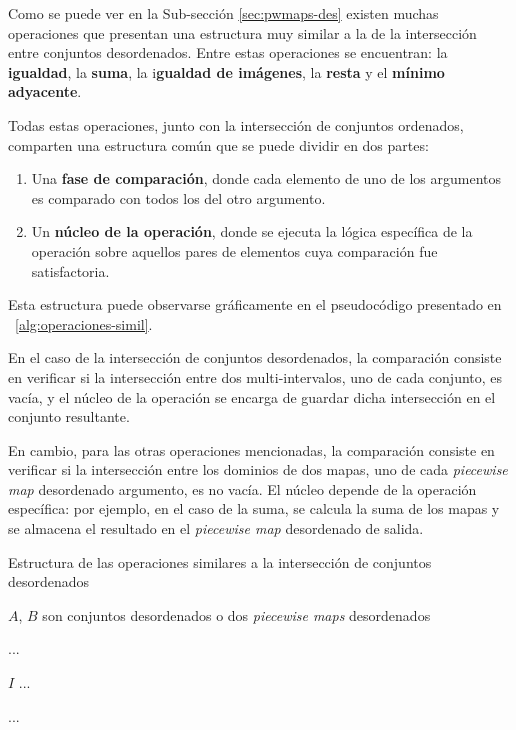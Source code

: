 Como se puede ver en la Sub-sección \ref{sec:pwmaps-des} existen muchas operaciones que presentan una estructura muy similar a la de la intersección entre conjuntos desordenados. Entre estas operaciones se encuentran: la \textbf{igualdad}, la \textbf{suma}, la i\textbf{gualdad de imágenes}, la \textbf{resta} y el \textbf{mínimo adyacente}.

Todas estas operaciones, junto con la intersección de conjuntos ordenados, comparten una estructura común que se puede dividir en dos partes: 
\begin{enumerate}
    \item Una\textbf{ fase de comparación}, donde cada elemento de uno de los argumentos es comparado con todos los del otro argumento.
    \item Un \textbf{núcleo de la operación}, donde se ejecuta la lógica específica de la operación sobre aquellos pares de elementos cuya comparación fue satisfactoria.
\end{enumerate}

Esta estructura puede observarse gráficamente en el pseudocódigo presentado en ~\ref{alg:operaciones-simil}.

En el caso de la intersección de conjuntos desordenados, la comparación consiste en verificar si la intersección entre dos multi-intervalos, uno de cada conjunto, es vacía, y el núcleo de la operación se encarga de guardar dicha intersección en el conjunto resultante.

En cambio, para las otras operaciones mencionadas, la comparación consiste en verificar si la intersección entre los dominios de dos mapas, uno de cada \textit{piecewise map} desordenado argumento, es no vacía. El núcleo depende de la operación específica: por ejemplo, en el caso de la suma, se calcula la suma de los mapas y se almacena el resultado en el \textit{piecewise map} desordenado de salida.


\begin{algorithm}
\caption{Estructura de las operaciones similares a la intersección de conjuntos desordenados}\label{alg:operaciones-simil}
\begin{algorithmic}[1]
\Require $A$, $B$ son conjuntos desordenados o dos \textit{piecewise maps} desordenados

\State ... 

 
        \State $I$ 
            \State ...  
        \EndIf
    \EndFor
\EndFor

\State \Return ...
\EndFunction
\end{algorithmic}
\end{algorithm}

